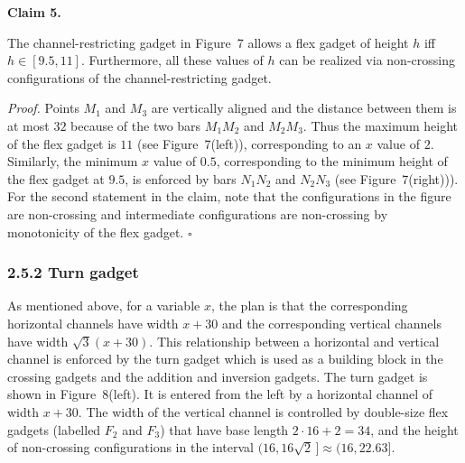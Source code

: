 \documentclass{article}
\begin{document}
\par\medskip\noindent\textbf{Claim 5.} \begin{itshape}

The channel-restricting gadget in Figure~7 
allows a flex gadget of height $h$ iff $h \in [9.5,11]$. Furthermore, all these values of $h$ can be realized via non-crossing configurations of the channel-restricting gadget.
\end{itshape}\par\medskip
\par\noindent\textit{Proof.} 
Points $M_1$ and $M_3$ are vertically aligned and the 
distance between them is at most $32$ because of the  
two bars $M_1 M_2$ and $M_2 M_3$.  Thus the maximum height of the flex gadget is $11$ (see  Figure~7(left)), corresponding to an $x$ value of $2$.
Similarly, the minimum $x$ value of $0.5$, corresponding to the minimum height of the flex gadget at $9.5$, is enforced by bars $N_1 N_2$ and $N_2 N_3$ (see Figure~7(right))). 
For the second statement in the claim, note that the configurations in the figure are non-crossing and intermediate configurations are non-crossing by monotonicity of the flex gadget.
\hfill$\square$\par\medskip

\subsubsection*{2.5.2 Turn gadget}
As mentioned above, for a variable $x$, the
plan is that the corresponding horizontal channels have width 
$x+30$ and the corresponding vertical channels have width $\sqrt{3}(x+30)$.  This relationship between a horizontal and vertical channel is enforced by the turn gadget which is used as a building block in  the crossing gadgets and the addition and inversion gadgets.
The turn gadget is shown in Figure~8(left). It is entered from the left by a horizontal channel of width $x+30$.
The width of the vertical channel is controlled 
by double-size flex gadgets
(labelled $F_2$ and $F_3$) that have base length $2 \cdot 16 + 2 = 34$, and the height 
of non-crossing configurations 
in the interval $(16, 16\sqrt{2}\,] \approx (16,22.63]$.
\end{document}
